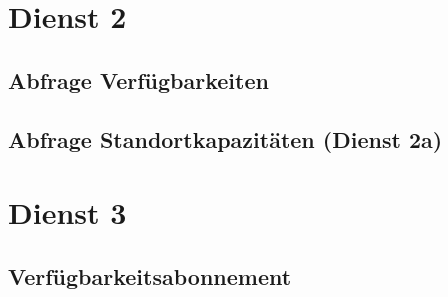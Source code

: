 \section{Dienst 2}
\label{sec:Nachrichten:Dienst2}

\subsection*{Abfrage Verfügbarkeiten}
\label{subsec:Nachrichten:Dienst2:Availability}



\medskip



\medskip


\subsection*{Abfrage Standortkapazitäten (Dienst 2a)}
\label{subsec:Nachrichten:Dienst2:PlaceAvailability}





\section{Dienst 3}
\label{sec:Nachrichten:Dienst3}

\subsection*{Verfügbarkeitsabonnement}
\label{subsec:Nachrichten:Dienst3:AvailabilitySubscription}



\medskip



% 

% 




